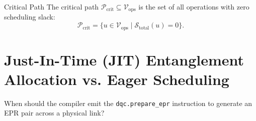 \begin{definitionbox}{Critical Path}
The critical path $\mathcal{P}_{\text{crit}} \subseteq \mathcal{V}_{\text{ops}} $ is the set of all operations with zero scheduling slack:
\begin{equation}
    \mathcal{P}_{\text{crit}} = \{ u \in \mathcal{V}_{\text{ops}} \mid \mathcal{S}_{\text{total}}(u) = 0 \}.
\end{equation}
\end{definitionbox}

\section{Just-In-Time (JIT) Entanglement Allocation vs. Eager Scheduling}
\label{sec:jit_scheduling}

When should the compiler emit the \texttt{dqc.prepare\_epr} instruction to generate an EPR pair across a physical link?

